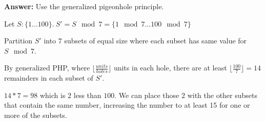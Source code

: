 \documentclass[landscape, letterpaper, 8pt]{extarticle}
\begin{document}
\begin{multicols}{3}
\begin{example}
        \textbf{Answer: } Use the generalized pigeonhole principle.

        Let $S: \{1\ldots100\}.~S' = S \mod 7 = \{1 \mod 7 \ldots 100 \mod 7\}$

        Partition $S'$ into $7$ subsets of equal size where each subset has same value for $S \mod 7$.

        By generalized PHP, where $\lfloor \frac{units}{holes}\rfloor$ units in each hole, there are at least $\lfloor \frac{100}{7} \rfloor = 14$ remainders in each subset of $S'$.

        $14 * 7 = 98$ which is $2$ less than $100$. We can place those $2$ with the other subsets that contain the same number, increasing the number to at least 15 for one or more of the subsets.

    \end{example}
\end{multicols}
\end{document}

